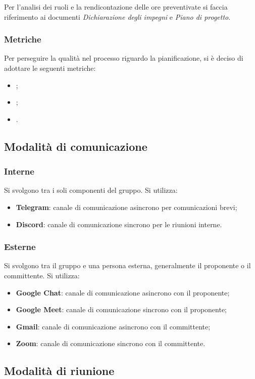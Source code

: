 Per l'analisi dei ruoli e la rendicontazione delle ore preventivate si faccia
riferimento ai documenti \textit{Dichiarazione degli impegni} e \textit{Piano
    di progetto}.

\subsubsection{Metriche}
Per perseguire la qualità nel processo riguardo la pianificazione, si è deciso
di adottare le seguenti metriche:
\begin{itemize}
    \item {};
    \item {};
    \item {}.
\end{itemize}

\subsection{Modalità di comunicazione}
\subsubsection{Interne}
Si svolgono tra i soli componenti del gruppo. Si utilizza:
\begin{itemize}
    \item \textbf{Telegram}: canale di comunicazione asincrono per comunicazioni brevi;
    \item \textbf{Discord}: canale di comunicazione sincrono per le riunioni interne.
\end{itemize}
\subsubsection{Esterne}
Si svolgono tra il gruppo e una persona esterna, generalmente il proponente
o il committente. Si utilizza:
\begin{itemize}
    \item \textbf{Google Chat}: canale di comunicazione asincrono con il proponente;
    \item \textbf{Google Meet}: canale di comunicazione sincrono con il proponente;
    \item \textbf{Gmail}: canale di comunicazione asincrono con il committente;
    \item \textbf{Zoom}: canale di comunicazione sincrono con il committente.
\end{itemize}

\subsection{Modalità di riunione}
